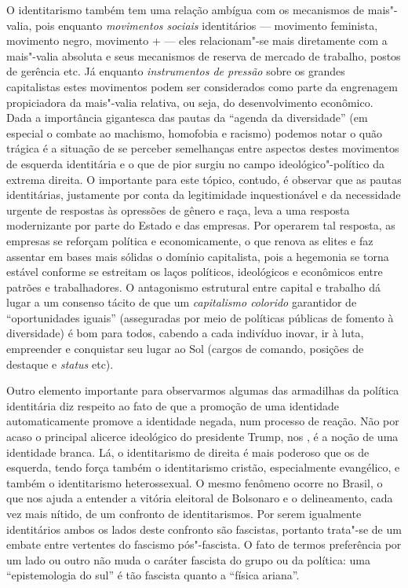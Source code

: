 O identitarismo também tem uma relação ambígua com os mecanismos de
mais"-valia, pois enquanto \emph{movimentos sociais} identitários ---
movimento feminista, movimento negro, movimento + --- eles
relacionam"-se mais diretamente com a mais"-valia absoluta e seus
mecanismos de reserva de mercado de trabalho, postos de gerência etc. Já
enquanto \emph{instrumentos de pressão} sobre os grandes capitalistas
estes movimentos podem ser considerados como parte da engrenagem
propiciadora da mais"-valia relativa, ou seja, do desenvolvimento
econômico. Dada a importância gigantesca das pautas da ``agenda da
diversidade'' (em especial o combate ao machismo, homofobia e racismo)
podemos notar o quão trágica é a situação de se perceber semelhanças
entre aspectos destes movimentos de esquerda identitária e o que de pior
surgiu no campo ideológico"-político da extrema direita. O importante
para este tópico, contudo, é observar que as pautas identitárias,
justamente por conta da legitimidade inquestionável e da necessidade
urgente de respostas às opressões de gênero e raça, leva a uma resposta
modernizante por parte do Estado e das empresas. Por operarem tal
resposta, as empresas se reforçam política e economicamente, o que
renova as elites e faz assentar em bases mais sólidas o domínio
capitalista, pois a hegemonia se torna estável conforme se estreitam os
laços políticos, ideológicos e econômicos entre patrões e trabalhadores.
O antagonismo estrutural entre capital e trabalho dá lugar a um consenso
tácito de que um \emph{capitalismo colorido} garantidor de
``oportunidades iguais'' (asseguradas por meio de políticas públicas de
fomento à diversidade) é bom para todos, cabendo a cada indivíduo
inovar, ir à luta, empreender e conquistar seu lugar ao Sol (cargos de
comando, posições de destaque e \emph{status} etc).

Outro elemento importante para observarmos algumas das armadilhas da
política identitária diz respeito ao fato de que a promoção de uma
identidade automaticamente promove a identidade negada, num processo de
reação. Não por acaso o principal alicerce ideológico do presidente
Trump, nos , é a noção de uma identidade branca. Lá, o identitarismo
de direita é mais poderoso que os de esquerda, tendo força também o
identitarismo cristão, especialmente evangélico, e também o
identitarismo heterossexual. O mesmo fenômeno ocorre no Brasil, o que
nos ajuda a entender a vitória eleitoral de Bolsonaro e o delineamento,
cada vez mais nítido, de um confronto de identitarismos. Por serem
igualmente identitários ambos os lados deste confronto são fascistas,
portanto trata"-se de um embate entre vertentes do fascismo pós"-fascista.
O fato de termos preferência por um lado ou outro não muda o caráter
fascista do grupo ou da política: uma ``epistemologia do sul'' é tão
fascista quanto a ``física ariana''.

